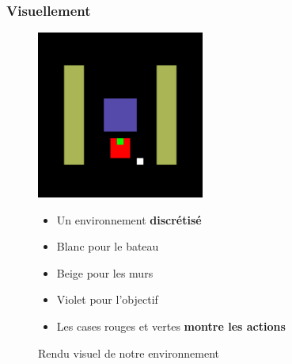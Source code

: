 \documentclass[8pt]{beamer}
\begin{document}
\begin{frame}

  \frametitle{Visuellement}

  \begin{figure}
    \begin{minipage}[c]{.55\linewidth}
      \centering
      \includegraphics[width=55mm]{map_v.png}
      \caption{Rendu visuel de notre environnement \footnotemark}
    \end{minipage}
    \hfill%
    \begin{minipage}[c]{.37\linewidth}
      \centering
      \begin{itemize}
      \item Un environnement \textbf{discrétisé}
    \item Blanc pour le bateau
    \item Beige pour les murs
    \item Violet pour l'objectif
    \item Les cases rouges et vertes \textbf{montre les actions}
      \end{itemize}
    \end{minipage}
  \end{figure}

\end{frame}
\end{document}
